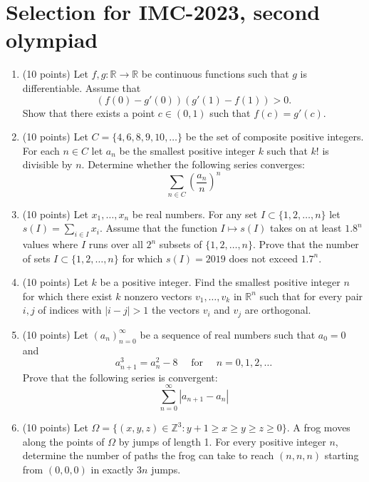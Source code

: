 \documentclass{article}
\begin{document}
\pagestyle{plain}

\section*{Selection for IMC-2023, second olympiad}

\begin{enumerate}
  \item (10 points) Let \(f, g : \mathbb{R} \rightarrow \mathbb{R}\) be continuous 
  functions such that \(g\) is differentiable. Assume that
  \[
  \left(f(0) - g'(0)\right)\left(g'(1) - f(1)\right) > 0.
  \]
  Show that there exists a point \(c \in (0, 1)\) such that \(f(c) = g'(c)\).
  
  \item (10 points) Let \(C = \{4, 6, 8, 9, 10, \ldots\}\) be the set of 
  composite positive integers. For each \(n \in C\) let \(a_n\) be 
  the smallest positive integer \(k\) such that \(k!\) is divisible by \(n\). 
  Determine whether the following series converges:
  \[
  \sum_{n \in C} \left(\frac{a_n}{n}\right)^n
  \]
  
  \item (10 points) Let \(x_1, \ldots, x_n\) be real numbers. 
  For any set \(I \subset \{1, 2, \ldots, n\}\) 
  let \(s(I) = \sum\limits_{i \in I} x_i\).
  Assume that the function \(I \mapsto s(I)\) takes on at least \(1.8^n\) 
  values where \(I\) runs over all \(2^n\) subsets of \(\{1, 2, \ldots, n\}\). 
  Prove that the number of sets \(I \subset \{1, 2, \ldots, n\}\) for which 
  \(s(I) = 2019\) does not exceed \(1.7^n\).
  
  \item (10 points) Let \(k\) be a positive integer. Find the smallest 
  positive integer \(n\) for which there exist \(k\) nonzero vectors 
  \(v_1, \ldots, v_k\) in \(\mathbb{R}^n\) such that for every pair 
  \(i, j\) of indices with \(|i - j| > 1\) the vectors \(v_i\) and \(v_j\) 
  are orthogonal.
  
  \item (10 points) Let \((a_n)_{n=0}^{\infty}\) be a sequence of real numbers 
  such that \(a_0 = 0\) and
  \[
  a_{n+1}^3 = a_{n}^2 - 8 \quad\text{  for  }\quad n = 0, 1, 2, \ldots
  \]
  Prove that the following series is convergent:
  \[
  \sum_{n=0}^{\infty} |a_{n+1} - a_n|
  \]
  
  \item (10 points) Let 
  \(\Omega = \{(x, y, z) \in \mathbb{Z}^3 : y + 1 \geq x \geq y \geq z \geq 0\}\). 
  A frog moves along the points of \(\Omega\) by jumps of length 1. 
  For every positive integer \(n\), determine the number of paths the frog 
  can take to reach \((n, n, n)\) starting from \((0, 0, 0)\) 
  in exactly \(3n\) jumps.
\end{enumerate}
\end{document}
